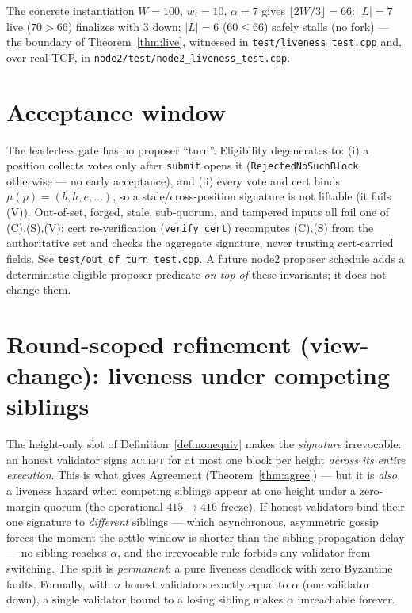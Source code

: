 \documentclass[11pt]{article}
\begin{document}
\noindent The concrete instantiation $W=100$, $w_i=10$, $\alpha=7$ gives
$\lfloor 2W/3\rfloor=66$: $|L|=7$ live ($70>66$) finalizes with $3$ down; $|L|=6$
($60\le 66$) safely stalls (no fork) --- the boundary of Theorem~\ref{thm:live},
witnessed in \texttt{test/liveness\_test.cpp} and, over real TCP, in
\texttt{node2/test/node2\_liveness\_test.cpp}.

\section{Acceptance window}

The leaderless gate has no proposer ``turn''. Eligibility degenerates to: (i) a
position collects votes only after \texttt{submit} opens it
(\texttt{RejectedNoSuchBlock} otherwise --- no early acceptance), and (ii) every vote
and cert binds $\mu(p)=(b,h,e,\dots)$, so a stale/cross-position signature is not
liftable (it fails (V)). Out-of-set, forged, stale, sub-quorum, and tampered inputs
all fail one of (C),(S),(V); cert re-verification (\texttt{verify\_cert}) recomputes
(C),(S) from the authoritative set and checks the aggregate signature, never trusting
cert-carried fields. See \texttt{test/out\_of\_turn\_test.cpp}. A future node2
proposer schedule adds a deterministic eligible-proposer predicate \emph{on top of}
these invariants; it does not change them.

\section{Round-scoped refinement (view-change): liveness under competing siblings}
\label{sec:roundscoped}

The height-only slot of Definition~\ref{def:nonequiv} makes the \emph{signature}
irrevocable: an honest validator signs \textsc{accept} for at most one block per height
\emph{across its entire execution}. This is what gives Agreement
(Theorem~\ref{thm:agree}) --- but it is \emph{also} a liveness hazard when competing
siblings appear at one height under a zero-margin quorum (the operational $415\!\to\!416$
freeze). If honest validators bind their one signature to \emph{different} siblings ---
which asynchronous, asymmetric gossip forces the moment the settle window is shorter than
the sibling-propagation delay --- no sibling reaches $\alpha$, and the irrevocable rule
forbids any validator from switching. The split is \emph{permanent}: a pure liveness
deadlock with zero Byzantine faults. Formally, with $n$ honest validators exactly equal to
$\alpha$ (one validator down), a single validator bound to a losing sibling makes $\alpha$
unreachable forever.
\end{document}
